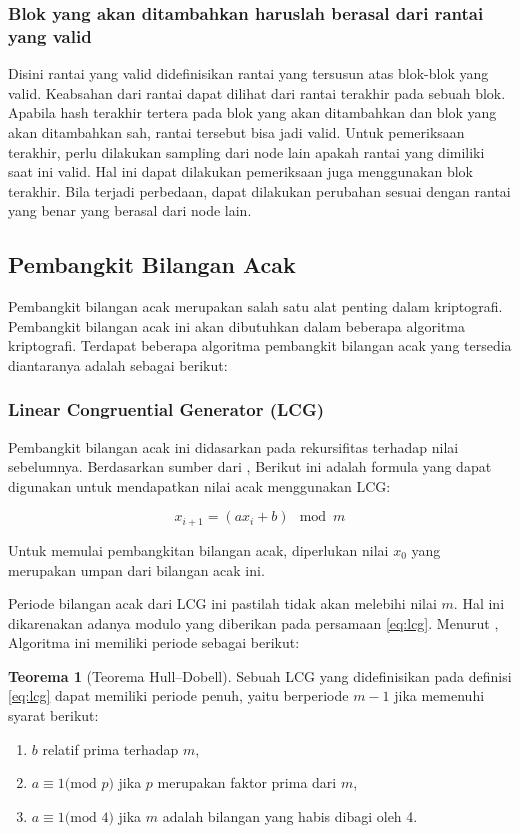 \documentclass[10pt,conference]{IEEEtran}
\theoremstyle{definition}
\newtheorem{theorem}{Teorema}[section]
\begin{document}
\subsubsection{Blok yang akan ditambahkan haruslah berasal dari rantai yang valid}
Disini rantai yang valid didefinisikan rantai yang tersusun atas blok-blok yang valid. Keabsahan dari rantai dapat dilihat dari rantai terakhir pada sebuah blok. Apabila hash terakhir tertera pada blok yang akan ditambahkan dan blok yang akan ditambahkan sah, rantai tersebut bisa jadi valid. Untuk pemeriksaan terakhir, perlu dilakukan sampling dari node lain apakah rantai yang dimiliki saat ini valid. Hal ini dapat dilakukan pemeriksaan juga menggunakan blok  terakhir. Bila terjadi perbedaan, dapat dilakukan perubahan sesuai dengan rantai yang benar yang berasal dari node lain.

\subsection{Pembangkit Bilangan Acak}
Pembangkit bilangan acak merupakan salah satu alat penting dalam kriptografi. Pembangkit bilangan acak ini akan dibutuhkan dalam beberapa algoritma kriptografi. Terdapat beberapa algoritma pembangkit bilangan acak yang tersedia diantaranya adalah sebagai berikut:

\subsubsection{Linear Congruential Generator (LCG)}

Pembangkit bilangan acak ini didasarkan pada rekursifitas terhadap nilai sebelumnya. Berdasarkan sumber dari \cite{b1}, Berikut ini adalah formula yang dapat digunakan untuk mendapatkan nilai acak menggunakan LCG:

\begin{equation} \label{eq:lcg}
    x_{i+1} = (ax_i + b) \mod m
\end{equation}

Untuk memulai pembangkitan bilangan acak, diperlukan nilai $x_0$ yang merupakan umpan dari bilangan acak ini.

Periode bilangan acak dari LCG ini pastilah tidak akan melebihi nilai $m$. Hal ini dikarenakan adanya modulo yang diberikan pada persamaan \ref{eq:lcg}. Menurut \cite{a1}, Algoritma ini memiliki periode sebagai berikut:

\begin{theorem}[Teorema Hull–Dobell] \label{theo:hulldobell}
    Sebuah LCG yang didefinisikan pada definisi \ref{eq:lcg} dapat memiliki periode penuh, yaitu berperiode $m-1$ jika memenuhi syarat berikut:
    \begin{enumerate}
        \item $b$ relatif prima terhadap $m$,
        \item $a \equiv 1 \text{(mod }p\text{)}$ jika $p$ merupakan faktor prima dari $m$,
        \item $a \equiv 1 \text{(mod }4\text{)}$ jika $m$ adalah bilangan yang habis dibagi oleh 4.
    \end{enumerate}
\end{theorem}
\end{document}
